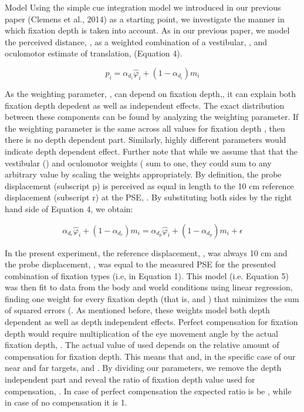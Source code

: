 \begin{equation}
\label{p4:eq3}
\end{equation}

Model
Using the simple cue integration model we introduced in our previous paper (Clemens et al., 2014) as a starting point, we investigate the manner in which fixation depth is taken into account. As in our previous paper, we model the perceived distance, , as a weighted combination of a vestibular, , and oculomotor estimate of translation,  (Equation 4). 

\begin{equation}
\label{p4:eq4}
p_i = \alpha_{d_i} \hat{\varphi}_i + (1 - \alpha_{d_i}) m_i
\end{equation}

As the weighting parameter, , can depend on fixation depth,, it can explain both fixation depth depedent as well as independent effects. The exact distribution between these components can be found by analyzing the weighting parameter. If the weighting parameter is the same across all values for fixation depth , then there is no depth dependent part. Similarly, highly different parameters would indicate depth dependent effect. Further note that while we assume that that the vestibular () and oculomotor weights ( sum to one, they could sum to any arbitrary value by scaling the weights appropriately. 
By definition, the probe displacement (subscript p) is perceived as equal in length to the 10 cm reference displacement (subscript r) at the PSE, . By substituting both sides by the right hand side of Equation 4, we obtain:

\begin{equation}
\label{p4:eq5}
\alpha_{d_r} \hat{\varphi}_i + (1 - \alpha_{d_r}) m_i = \alpha_{d_p} \hat{\varphi}_i + (1 - \alpha_{d_p}) m_i + \epsilon
\end{equation}

In the present experiment, the reference displacement, , was always 10 cm and the probe displacement, , was equal to the measured PSE for the presented combination of fixation types (i.e,  in Equation 1). This model (i.e. Equation 5) was then fit to data from the body and world conditions using linear regression, finding one weight for every fixation depth (that is,  and ) that minimizes the sum of squared errors (. 
As mentioned before, these weights model both depth dependent as well as depth independent effects. Perfect compensation for fixation depth would require multiplication of the eye movement angle by the actual fixation depth, . The actual value of  used depends on the relative amount of compensation for fixation depth. This means that   and, in the specific case of our near and far targets,  and . By dividing our parameters, we remove the depth independent part  and reveal the ratio of fixation depth value used for compensation, . In case of perfect compensation the expected ratio is be , while in case of no compensation it is 1.
